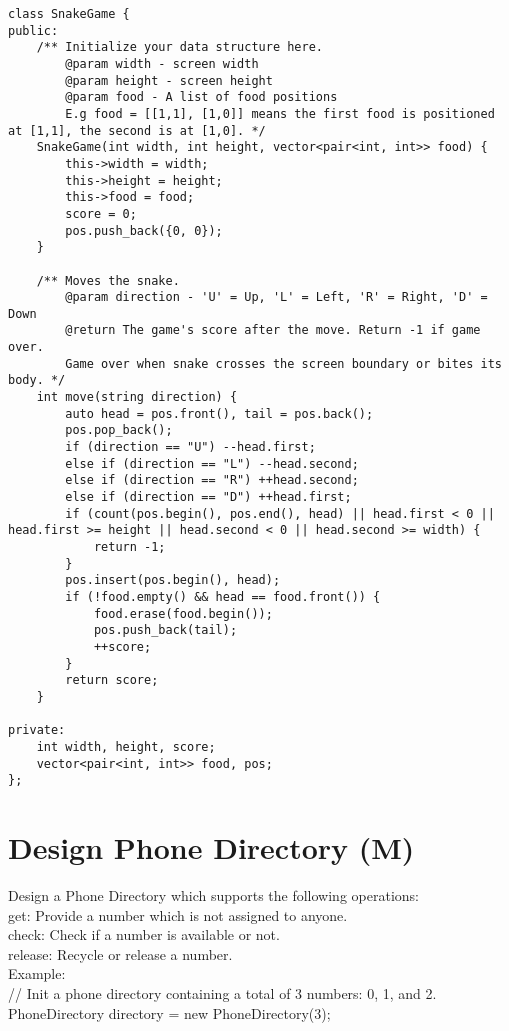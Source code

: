 \begin{lstlisting}
class SnakeGame {
public:
    /** Initialize your data structure here.
        @param width - screen width
        @param height - screen height 
        @param food - A list of food positions
        E.g food = [[1,1], [1,0]] means the first food is positioned at [1,1], the second is at [1,0]. */
    SnakeGame(int width, int height, vector<pair<int, int>> food) {
        this->width = width;
        this->height = height;
        this->food = food;
        score = 0;
        pos.push_back({0, 0});
    }
    
    /** Moves the snake.
        @param direction - 'U' = Up, 'L' = Left, 'R' = Right, 'D' = Down 
        @return The game's score after the move. Return -1 if game over. 
        Game over when snake crosses the screen boundary or bites its body. */
    int move(string direction) {
        auto head = pos.front(), tail = pos.back();
        pos.pop_back();
        if (direction == "U") --head.first;
        else if (direction == "L") --head.second;
        else if (direction == "R") ++head.second;
        else if (direction == "D") ++head.first;
        if (count(pos.begin(), pos.end(), head) || head.first < 0 || head.first >= height || head.second < 0 || head.second >= width) {
            return -1;
        }
        pos.insert(pos.begin(), head);
        if (!food.empty() && head == food.front()) {
            food.erase(food.begin());
            pos.push_back(tail);
            ++score;
        }
        return score;
    }

private:
    int width, height, score;
    vector<pair<int, int>> food, pos;
};
\end{lstlisting}


\section{Design Phone Directory (M)}
Design a Phone Directory which supports the following operations:\\
    get: Provide a number which is not assigned to anyone.\\
    check: Check if a number is available or not.\\
    release: Recycle or release a number.\\

Example:\\
// Init a phone directory containing a total of 3 numbers: 0, 1, and 2.\\
PhoneDirectory directory = new PhoneDirectory(3);\\

